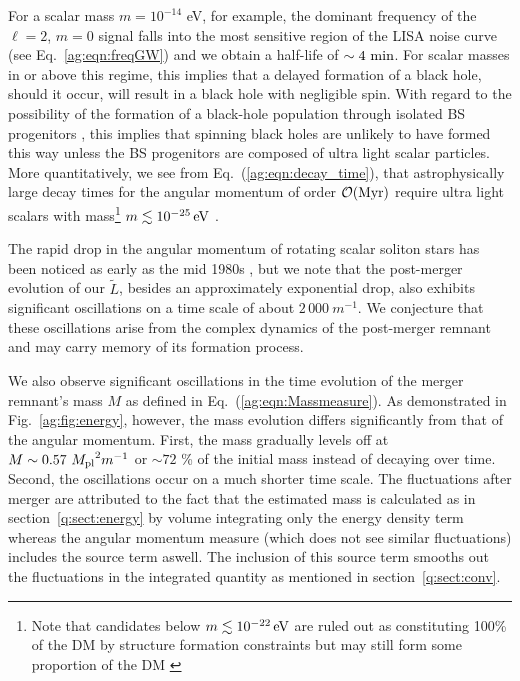 %
For a scalar mass $m =  10^{-14}$ eV, for example,
the dominant frequency of the $\ell=2$, $m=0$ signal
falls into the most sensitive region of the LISA noise curve (see Eq.~\ref{ag:eqn:freqGW}) and we obtain a half-life of $\sim4~{\rm min}$. For scalar masses in or above this regime, this implies
that a delayed formation of a black hole, should it occur,
will result in a black hole with negligible spin. With regard to
the possibility of the formation of a black-hole population
through isolated BS progenitors
\cite{Helfer:2016ljl,Muia:2019coe}, this implies that
spinning black holes are unlikely to have formed this way unless
the BS progenitors are composed of ultra light scalar particles.
More quantitatively, we see from
Eq.~(\ref{ag:eqn:decay_time}), that
astrophysically large decay times for the angular momentum
of order
$\mathcal{O}({\rm Myr})$ require ultra light
scalars with mass\footnote{Note that candidates below $m\lesssim 10^{-22}\,{\rm eV}$ are ruled out as constituting 100\% of the DM by structure formation constraints but may still form some proportion of the DM \cite{Marsh:2015xka}}
$m\lesssim 10^{-25}\,{\rm eV}$ .



The rapid drop in the angular momentum of rotating
scalar soliton stars has been noticed as early as the mid 1980s
\cite{Lee:1986ts,Friedberg:1986tq},
but we note that the post-merger evolution of our $\tilde{L}$,
besides an approximately exponential drop, also exhibits
significant oscillations on a time scale of about
$2\,000~m^{-1}$. We conjecture that these oscillations
arise from the complex dynamics of the post-merger remnant
and may carry memory of its formation process.

We also observe significant oscillations in the time evolution
of the merger remnant's mass $M$ as defined in Eq.~(\ref{ag:eqn:Massmeasure}). As demonstrated in
Fig.~\ref{ag:fig:energy}, however, the mass evolution differs
significantly from that of the angular momentum.
First, the mass gradually levels off
at $M \sim 0.57~{M_{\rm pl}}^2 m^{-1}$ or $\sim 72$ \% of the initial mass instead of decaying over time.
Second, the oscillations occur on a much shorter time scale.
\color{orchid} The fluctuations after merger
are attributed to the fact that the estimated mass is calculated
as in section~\ref{q:sect:energy} by volume integrating only the energy
density term whereas the angular momentum
measure (which does not see similar fluctuations) includes the source term
aswell. The inclusion of this source term smooths out the fluctuations in
the integrated quantity as mentioned in section~\ref{q:sect:conv}.\color{black}

